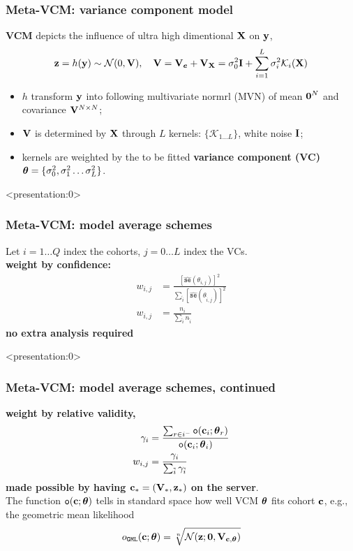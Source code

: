 \documentclass{beamer}
\newcommand{\se}[1]{\hat{\mathtt{se}}\left(#1\right)} %
\newcommand{\ti}{{\tilde{i}}}                         %
\newcommand{\ef}{{\mathtt{o}}}                        %
\begin{document}
\begin{frame}
  \frametitle{Meta-VCM: variance component model} %
  \textbf{VCM} depicts the influence of ultra high dimentional $\mathbf{X}$
  on $\mathbf{y}$,
  \begin{align}\label{eq:vcm}
    \mathbf{z}=h(\mathbf{y}) \sim \mathcal{N}(0, \mathbf{V}), \quad
    \mathbf{V} = \mathbf{V}_{\boldsymbol{e}} + \mathbf{V}_{\mathbf{X}} = \sigma^2_0 \textbf{I} + \sum_{i=1}^L
    \sigma^2_i \mathcal{K}_i(\mathbf{X})
  \end{align}
  \begin{itemize}
  \item $h$ transform $\mathbf{y}$ into following multivariate normrl (MVN)
    of mean $\boldsymbol{0}^N$ and covariance $\mathbf{V}^{N \times N}$;
  \item $\mathbf{V}$ is determined by $\mathbf{X}$ through $L$ kernels:
    $\{\mathcal{K}_{1 \dots L}\}$, white noise $\textbf{I}$;
  \item kernels are weighted by the to be fitted \textbf{variance
      component (VC)}
    $\boldsymbol{\theta} = \{\sigma^2_0, \sigma^2_1 \dots \sigma^2_L\}$.
  \end{itemize}
\end{frame}
\begin{frame}<presentation:0> %
  \frametitle{Meta-VCM: model average schemes} %
  Let $i = 1 \dots Q$ index the cohorts, $j = 0 \dots L$ index the VCs.\\
  \textbf{weight by confidence:}
  \begin{align}
    w_{i,j} &= \frac{\left[\se{\theta_{i,j}} \right ]^2}
              {\sum_\ti \left[\se{\theta_{\ti,j}} \right ]^2} \\
    w_{i,j} &= \frac{n_i}{\sum_\ti n_\ti}
  \end{align}
  {\color{blue}\textbf{no extra analysis required}}
\end{frame}
\begin{frame}<presentation:0> %
  \frametitle{Meta-VCM: model average schemes, continued} %
  \textbf{weight by relative validity,}
  \begin{align}
    \gamma_i &= \frac{\sum_{r \in i^-}{\ef( \vc_i; \vtheta_r)}}
               {\ef(\vc_i; \vtheta_i)} \\
    w_{i,j}  &= \frac{\gamma_i}{\sum_\ti \gamma_\ti}
  \end{align}
  {\color{red}\textbf{made possible by having $\mathbf{c}_*=(\mathbf{V}_*, \mathbf{z}_*)$
      on the server}}. \\
  The function $\ef(\vc;\vtheta)$ tells in standard space how well VCM
  $\boldsymbol{\theta}$ fits cohort $\mathbf{c}$, e.g., the geometric mean likelihood
  \begin{align}
    o_\mathtt{GML}(\mathbf{c}; \boldsymbol{\theta}) = \sqrt[n]{\mathcal{N}(\mathbf{z};\boldsymbol{0}, \mathbf{V}_{\mathbf{c}, \boldsymbol{\theta}})}
  \end{align}
\end{frame}
\end{document}
